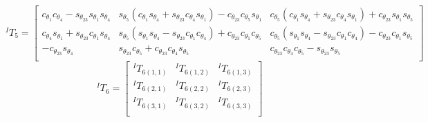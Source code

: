 \documentclass[12pt]{report}
\begin{document}
\[
^IT_5 =
\begin{bmatrix}
c_{\theta_1}c_{\theta_4} - s_{\theta_{23}}s_{\theta_1}s_{\theta_4}& s_{\theta_5}(c_{\theta_1}s_{\theta_4} + s_{\theta_{23}}c_{\theta_4}s_{\theta_1}) - c_{\theta_{23}}c_{\theta_5}s_{\theta_1}& c_{\theta_5}(c_{\theta_1}s_{\theta_4} +
 s_{\theta_{23}}c_{\theta_4}s_{\theta_1}) + c_{\theta_{23}}s_{\theta_1}s_{\theta_5}\\
c_{\theta_4}s_{\theta_1} + s_{\theta_{23}}c_{\theta_1}s_{\theta_4}& s_{\theta_5}(s_{\theta_1}s_{\theta_4} - s_{\theta_{23}}c_{\theta_1}c_{\theta_4}) + c_{\theta_{23}}c_{\theta_1}c_{\theta_5}& c_{\theta_5}(s_{\theta_1}s_{\theta_4} - s_{\theta_{23}}c_{\theta_1}c_{\theta_4}) - c_{\theta_{23}}c_{\theta_1}s_{\theta_5}\\
-c_{\theta_{23}}s_{\theta_4}&                                                     s_{\theta_{23}}c_{\theta_5} + c_{\theta_{23}}c_{\theta_4}s_{\theta_5}&                                                     c_{\theta_{23}}c_{\theta_4}c_{\theta_5} - s_{\theta_{23}}s_{\theta_5}\\
\end{bmatrix}
\]
\[
^IT_6 =
\begin{bmatrix}
  ^IT_{6(1,1)} & ^IT_{6(1,2)} & ^IT_{6(1,3)}\\
  ^IT_{6(2,1)} & ^IT_{6(2,2)} & ^IT_{6(2,3)}\\
  ^IT_{6(3,1)} & ^IT_{6(3,2)} & ^IT_{6(3,3)}\\
\end{bmatrix}
\]
\end{document}
